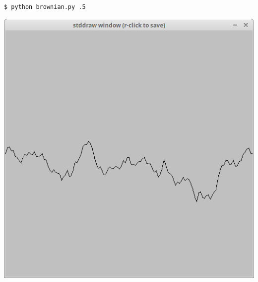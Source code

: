 \documentclass[8pt,a4paper,compress,handout]{beamer}
\begin{document}
\begin{frame}[fragile]
\begin{minipage}{160pt}
\begin{lstlisting}[language={}]
$ python brownian.py .5
\end{lstlisting}
\end{minipage}%
\begin{minipage}{140pt}
\hfill \includegraphics[scale=0.15]{figures/brownian2.png}
\end{minipage}

\smallskip


\end{frame}
\end{document}
